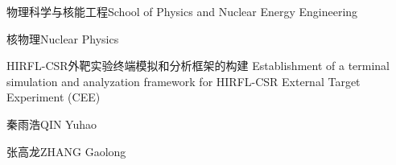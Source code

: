 
\school
{物理科学与核能工程}{School of Physics and Nuclear Energy Engineering}

\major
{核物理}{Nuclear Physics}

\thesistitle
{HIRFL-CSR外靶实验终端模拟和分析框架的构建}
{}
{Establishment of a terminal simulation and analyzation framework for
 HIRFL-CSR External Target Experiment (CEE)}
{}

\thesisauthor
{秦雨浩}{QIN Yuhao}

\teacher
{张高龙}{ZHANG Gaolong}






